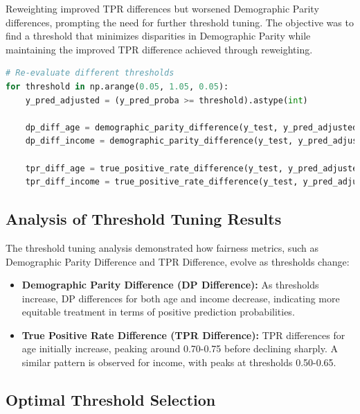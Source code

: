 \documentclass[12pt,a4paper]{report}
\begin{document}
Reweighting improved TPR differences but worsened Demographic Parity differences, prompting the need for further threshold tuning. The objective was to find a threshold that minimizes disparities in Demographic Parity while maintaining the improved TPR difference achieved through reweighting.\\

\clearpage

\begin{lstlisting}[language=Python, caption={Threshold Tuning After Reweighting}]
# Re-evaluate different thresholds
for threshold in np.arange(0.05, 1.05, 0.05):
    y_pred_adjusted = (y_pred_proba >= threshold).astype(int)
    
    dp_diff_age = demographic_parity_difference(y_test, y_pred_adjusted, sensitive_features=X_test['customer_age'])
    dp_diff_income = demographic_parity_difference(y_test, y_pred_adjusted, sensitive_features=X_test['income'])
    
    tpr_diff_age = true_positive_rate_difference(y_test, y_pred_adjusted, sensitive_features=X_test['customer_age'])
    tpr_diff_income = true_positive_rate_difference(y_test, y_pred_adjusted, sensitive_features=X_test['income'])
\end{lstlisting}

\subsection{Analysis of Threshold Tuning Results}

The threshold tuning analysis demonstrated how fairness metrics, such as Demographic Parity Difference and TPR Difference, evolve as thresholds change:

\begin{itemize}
    \item \textbf{Demographic Parity Difference (DP Difference):} As thresholds increase, DP differences for both age and income decrease, indicating more equitable treatment in terms of positive prediction probabilities.
    \item \textbf{True Positive Rate Difference (TPR Difference):} TPR differences for age initially increase, peaking around 0.70-0.75 before declining sharply. A similar pattern is observed for income, with peaks at thresholds 0.50-0.65.
\end{itemize}

\subsection{Optimal Threshold Selection}
\end{document}
